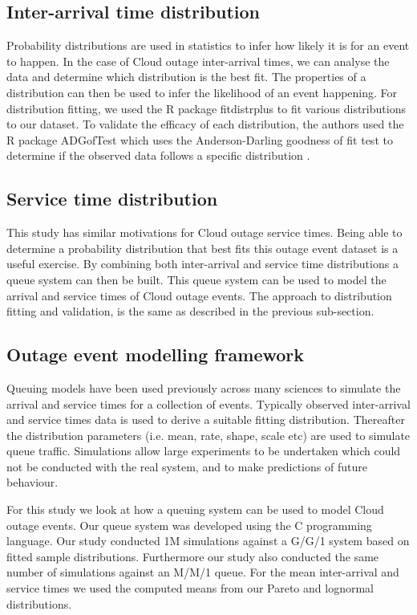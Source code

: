 \documentclass[5p]{elsarticle}
\begin{document}
\subsection{Inter-arrival time distribution}

Probability distributions are used in statistics to infer how likely it is for an event to happen. In the case of Cloud outage inter-arrival times,  we can analyse the data and determine which distribution is the best fit. The properties of a distribution can then be used to infer the likelihood of an event happening. For distribution fitting, we used the R package fitdistrplus \cite{fitdistrplus} to fit various distributions to our dataset. To validate the efficacy of each distribution,  the authors used the R package ADGofTest \cite{ADGoF} which uses the Anderson-Darling goodness of fit test to determine if the observed data follows a specific distribution \cite {anderson1952asymptotic}.

\subsection{Service time distribution}

This study has similar motivations for Cloud outage service times. Being able to determine a probability distribution that best fits this outage event dataset is a useful exercise. By combining both inter-arrival and service time distributions a queue system can then be built. This queue system can be used to model the arrival and service times of Cloud outage events. The approach to distribution fitting and validation, is the same as described in the previous sub-section. 

\subsection{Outage event modelling framework}

Queuing models have been used previously across many sciences to simulate the arrival and service times for a collection of events. Typically observed inter-arrival and service times data is used to derive a suitable fitting distribution. Thereafter the distribution parameters (i.e. mean, rate, shape, scale etc) are used to simulate queue traffic. Simulations allow large experiments to be undertaken which could not be conducted with the real system, and to make predictions of future behaviour.

For this study we look at how a queuing system can be used to model Cloud outage events. Our queue system was developed using the C programming language. Our study conducted 1M simulations against a G/G/1 system based on fitted sample distributions. Furthermore our study also conducted the same number of simulations against an M/M/1 queue. For the mean inter-arrival and service times we used the computed means from our Pareto and lognormal distributions.
\end{document}
